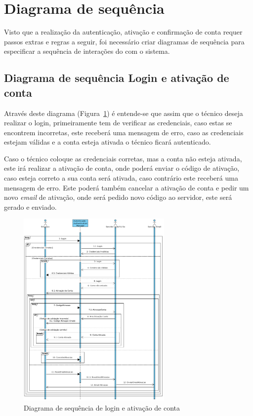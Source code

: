 \newpage

\section{Diagrama de sequência}

Visto que a realização da autenticação, ativação e confirmação de conta requer passos extras e regras a seguir, 
foi necessário criar diagramas de sequência para especificar a sequência de interações do com o sistema.

\subsection{Diagrama de sequência Login e ativação de conta}

Através deste diagrama (Figura~\ref{fig:43}) é entende-se que assim que o técnico deseja realizar o 
login, primeiramente tem de verificar as credenciais, caso estas se encontrem incorretas, este receberá 
uma mensagem de erro, caso as credenciais estejam válidas e a conta esteja ativada o técnico ficará 
autenticado. 

Caso o técnico coloque as credenciais corretas, mas a conta não esteja ativada, este irá realizar a 
ativação de conta, onde poderá enviar o código de ativação, caso esteja correto a sua conta será 
ativada, caso contrário este receberá uma mensagem de erro. Este poderá também cancelar a 
ativação de conta e pedir um novo \textit{email} de ativação, onde será pedido novo código ao servidor, 
este será gerado e enviado.

\begin{figure}[htb]
    \centering
    \includegraphics[width=0.67\textwidth]{images/diagramas/sequencia/diagrama_login.png}
    \caption{Diagrama de sequência de login e ativação de conta}
    \label{fig:43}
\end{figure}

